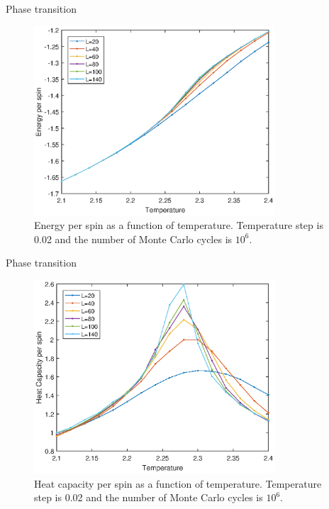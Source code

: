 \documentclass{beamer}
\begin{document}
\begin{frame}{Phase transition}
\begin{figure}
	\includegraphics[width=0.8\textwidth]{Tran_ene.eps}
	\caption{Energy per spin as a function of temperature. Temperature step is 0.02 and the number of Monte Carlo cycles is $10^6$.  }
\end{figure}
\end{frame}

\begin{frame}{Phase transition}
\begin{figure}
	\includegraphics[width=0.8\textwidth]{Tran_Cv.eps}
	\caption{Heat capacity per spin as a function of temperature. Temperature step is 0.02 and the number of Monte Carlo cycles is $10^6$.  }
\end{figure}
\end{frame}
\end{document}
